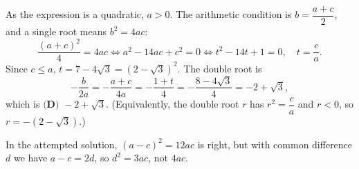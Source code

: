As the expression is a quadratic, $a>0$. The arithmetic condition is $b=\dfrac{a+c}{2}$, and a single root means $b^2=4ac$:
\[\dfrac{(a+c)^2}{4}=4ac\iff a^2-14ac+c^2=0\iff t^2-14t+1=0,\quad t=\dfrac ca.\]
Since $c\le a$, $t=7-4\sqrt3=\left(2-\sqrt3\right)^2$. The double root is
\[-\dfrac{b}{2a}=-\dfrac{a+c}{4a}=-\dfrac{1+t}{4}=-\dfrac{8-4\sqrt3}{4}=-2+\sqrt3,\]
which is $\boxed{\textbf{(D) }-2+\sqrt3}$. (Equivalently, the double root $r$ has $r^2=\dfrac ca$ and $r<0$, so $r=-\left(2-\sqrt3\right)$.)

In the attempted solution, $(a-c)^2=12ac$ is right, but with common difference $d$ we have $a-c=2d$, so $d^2=3ac$, not $4ac$.
